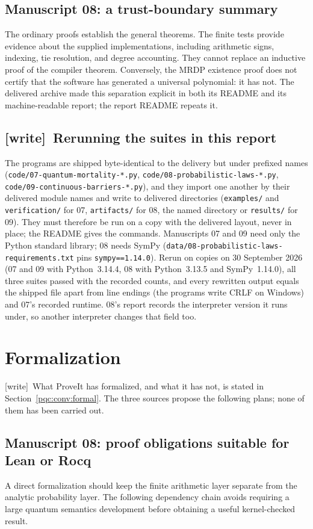 \documentclass[11pt,letterpaper]{article}
\numberwithin{equation}{section}
\theoremstyle{definition}
\theoremstyle{remark}
\newcommand{\code}[1]{\nolinkurl{#1}}
\newcommand{\wtag}{\textup{[write]}}
\begin{document}
\subsection{Manuscript 08: a trust-boundary summary}
The ordinary proofs establish the general theorems. The finite tests provide
evidence about the supplied implementations, including arithmetic signs,
indexing, tie resolution, and degree accounting. They cannot replace an
inductive proof of the compiler theorem. Conversely, the MRDP existence
proof does not certify that the software has generated a universal
polynomial: it has not. The delivered archive made this separation explicit in both
its README and its machine-readable report; the report README repeats it.

\subsection{\wtag\ Rerunning the suites in this report}
The programs are shipped byte-identical to the delivery but under prefixed
names (\code{code/07-quantum-mortality-*.py},
\code{code/08-probabilistic-laws-*.py},
\code{code/09-continuous-barriers-*.py}), and they import one another by
their delivered module names and write to delivered directories
(\code{examples/} and \code{verification/} for 07, \code{artifacts/} for
08, the named directory or \code{results/} for 09). They must therefore be
run on a copy with the delivered layout, never in place; the README gives
the commands. Manuscripts 07 and 09 need only the Python standard library;
08 needs SymPy (\code{data/08-probabilistic-laws-requirements.txt} pins
\code{sympy==1.14.0}). Rerun on copies on 30 September 2026 (07 and 09
with Python~3.14.4, 08 with Python~3.13.5 and SymPy~1.14.0), all three suites
passed with the recorded counts, and every rewritten output equals the
shipped file apart from line endings (the programs write CRLF on Windows)
and 07's recorded runtime. 08's report records the interpreter version it
runs under, so another interpreter changes that field too.

\section{Formalization}
\label{pqc:conv:formalization}
\wtag\ What ProveIt has formalized, and what it has not, is stated in
Section~\ref{pqc:conv:formal}. The three sources propose the following
plans; none of them has been carried out.

\subsection{Manuscript 08: proof obligations suitable for Lean or Rocq}
A direct formalization should keep the finite arithmetic layer separate
from the analytic probability layer. The following dependency chain avoids
requiring a large quantum semantics development before obtaining a useful
kernel-checked result.
\end{document}

